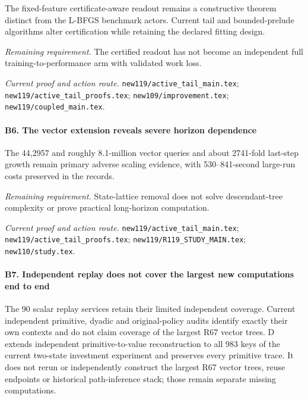 The fixed-feature certificate-aware readout remains a constructive theorem distinct from the L-BFGS benchmark actors. Current tail and bounded-prelude algorithms alter certification while retaining the declared fitting design.

\par\emph{Remaining requirement.} The certified readout has not become an independent full training-to-performance arm with validated work loss.

\par\emph{Current proof and action route.} \nolinkurl{new119/active_tail_main.tex}; \nolinkurl{new119/active_tail_proofs.tex}; \nolinkurl{new109/improvement.tex}; \nolinkurl{new119/coupled_main.tex}.

\paragraph{B6. The vector extension reveals severe horizon dependence}

The 44,2957 and roughly 8.1-million vector queries and about 2741-fold last-step growth remain primary adverse scaling evidence, with 530--841-second large-run costs preserved in the records.

\par\emph{Remaining requirement.} State-lattice removal does not solve descendant-tree complexity or prove practical long-horizon computation.

\par\emph{Current proof and action route.} \nolinkurl{new119/active_tail_main.tex}; \nolinkurl{new119/active_tail_proofs.tex}; \nolinkurl{new119/R119_STUDY_MAIN.tex}; \nolinkurl{new110/study.tex}.

\paragraph{B7. Independent replay does not cover the largest new computations end to end}

The 90 scalar replay services retain their limited independent coverage. Current independent primitive, dyadic and original-policy audits identify exactly their own contexts and do not claim coverage of the largest R67 vector trees. D extends independent primitive-to-value reconstruction to all 983 keys of the current two-state investment experiment and preserves every primitive trace. It does not rerun or independently construct the largest R67 vector trees, reuse endpoints or historical path-inference stack; those remain separate missing computations.

